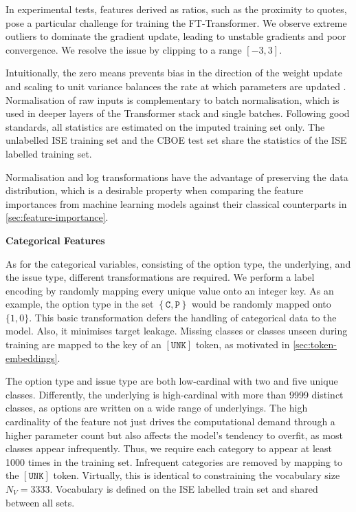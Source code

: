 In experimental tests, features derived as ratios, such as the proximity to quotes, pose a particular challenge for training the FT-Transformer. We observe extreme outliers to dominate the gradient update, leading to unstable gradients and poor convergence. We resolve the issue by clipping to a range $[-3,3]$.

Intuitionally, the zero means prevents bias in the direction of the weight update and scaling to unit variance balances the rate at which parameters are updated \autocite[][8]{lecunEfficientBackProp2012}. Normalisation of raw inputs is complementary to batch normalisation, which is used in deeper layers of the Transformer stack and single batches. Following good standards, all statistics are estimated on the imputed training set only. The unlabelled \gls{ISE} training set and the \gls{CBOE} test set share the statistics of the \gls{ISE} labelled training set.

Normalisation and log transformations have the advantage of preserving the data distribution, which is a desirable property when comparing the feature importances from machine learning models against their classical counterparts in \cref{sec:feature-importance}.

\textbf{Categorical Features}

As for the categorical variables, consisting of the option type, the underlying, and the issue type, different transformations are required. We perform a label encoding by randomly mapping every unique value onto an integer key. As an example, the option type in the set $\left\{\mathtt{C},\mathtt{P}\right\}$ would be randomly mapped onto $\{1,0\}$. This basic transformation defers the handling of categorical data to the model. Also, it minimises target leakage. Missing classes or classes unseen during training are mapped to the key of an $\mathtt{[UNK]}$ \gls{token}, as motivated in \cref{sec:token-embeddings}.

The option type and issue type are both low-cardinal with two and five unique classes. Differently, the underlying is high-cardinal with more than \num{9999} distinct classes, as options are written on a wide range of underlyings. The high cardinality of the feature not just drives the computational demand through a higher parameter count but also affects the model's tendency to overfit, as most classes appear infrequently. Thus, we require each category to appear at least \num{1000} times in the training set. Infrequent categories are removed by mapping to the $\mathtt{[UNK]}$ \gls{token}. Virtually, this is identical to constraining the vocabulary size $N_V = \num{3333}$. Vocabulary is defined on the \gls{ISE} labelled train set and shared between all sets.

